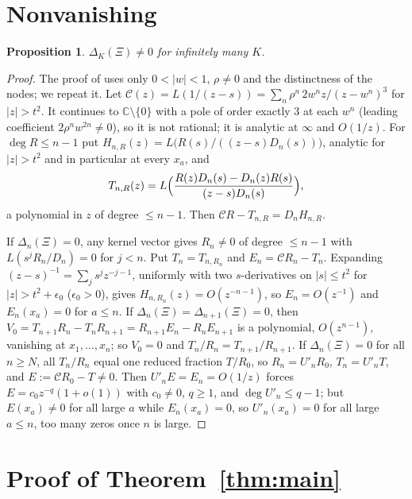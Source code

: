 \documentclass[11pt]{amsart}
\newtheorem{proposition}[theorem]{Proposition}
\theoremstyle{definition}
\theoremstyle{remark}
\numberwithin{equation}{section}
\newcommand{\CC}{\mathbb{C}}
\newcommand{\cC}{\mathcal{C}}
\begin{document}
\section{Nonvanishing}\label{sec:nonvan}

\begin{proposition}\label{prop:nonvan}
$\Delta_K(\Xi)\ne0$ for infinitely many $K$.
\end{proposition}
\begin{proof}
The proof of \cite[Proposition~6.1]{Kri26} uses only $0<|w|<1$, $\rho\ne0$ and the distinctness of the nodes; we repeat
it. Let $\cC(z)=L(1/(z-s))=\sum_n\rho^n\,2w^nz/(z-w^n)^3$ for $|z|>t^2$. It continues to $\CC\setminus\{0\}$ with a pole
of order exactly $3$ at each $w^n$ (leading coefficient $2\rho^nw^{2n}\ne0$), so it is not rational; it is analytic at
$\infty$ and $O(1/z)$. For $\deg R\le n-1$ put $H_{n,R}(z)=L\bigl(R(s)/((z-s)D_n(s))\bigr)$, analytic for $|z|>t^2$
and in particular at every $x_a$, and
\[
T_{n,R}(z)=L\Bigl(\frac{R(z)D_n(s)-D_n(z)R(s)}{(z-s)D_n(s)}\Bigr),
\]
a polynomial in $z$ of degree $\le n-1$. Then $\cC R-T_{n,R}=D_nH_{n,R}$.

If $\Delta_n(\Xi)=0$, any kernel vector gives $R_n\ne0$ of degree $\le n-1$ with $L(s^jR_n/D_n)=0$ for $j<n$. Put
$T_n=T_{n,R_n}$ and $E_n=\cC R_n-T_n$. Expanding $(z-s)^{-1}=\sum_js^jz^{-j-1}$, uniformly with two $s$-derivatives on
$|s|\le t^2$ for $|z|>t^2+\epsilon_0$ ($\epsilon_0>0$), gives $H_{n,R_n}(z)=O(z^{-n-1})$, so $E_n=O(z^{-1})$ and $E_n(x_a)=0$ for $a\le n$.
If $\Delta_n(\Xi)=\Delta_{n+1}(\Xi)=0$, then $V_0=T_{n+1}R_n-T_nR_{n+1}=R_{n+1}E_n-R_nE_{n+1}$ is a polynomial,
$O(z^{n-1})$, vanishing at $x_1,\dots,x_n$; so $V_0=0$ and $T_n/R_n=T_{n+1}/R_{n+1}$. If $\Delta_n(\Xi)=0$ for all $n\ge N$,
all $T_n/R_n$ equal one reduced fraction $T/R_0$, so $R_n=U'_nR_0$, $T_n=U'_nT$, and $E:=\cC R_0-T\ne0$. Then
$U'_nE=E_n=O(1/z)$ forces $E=c_0z^{-q}(1+o(1))$ with $c_0\ne0$, $q\ge1$, and $\deg U'_n\le q-1$; but $E(x_a)\ne0$ for all
large $a$ while $E_n(x_a)=0$, so $U'_n(x_a)=0$ for all large $a\le n$, too many zeros once $n$ is large.
\end{proof}

\section{\texorpdfstring{Proof of Theorem~\ref{thm:main}}{Proof of the theorem}}\label{sec:proof}
\end{document}
